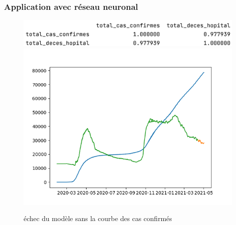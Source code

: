 \documentclass{beamer}[aspectratio = 43]
\begin{document}
\begin{frame}
	\frametitle{Application avec réseau neuronal}
	\begin{figure}
		\includegraphics[scale=0.45]{cor1}
		\includegraphics[scale=0.4]{NN_up}
		\caption{échec du modèle sans la courbe des cas confirmés}
	\end{figure}
\end{frame}

\appendix
\end{document}
